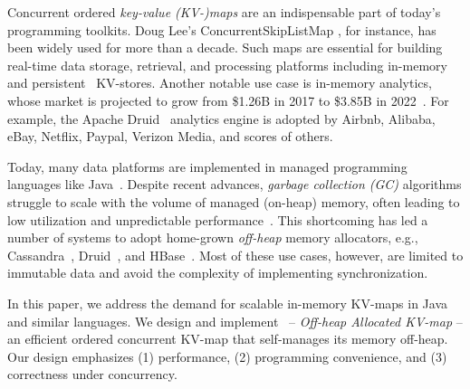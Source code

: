 Concurrent ordered  \emph{key-value (KV-)maps}  are 
an indispensable  part of today's programming toolkits. Doug Lee's ConcurrentSkipListMap \cite{JavaSkipList}, for instance, has been widely used for more than a decade. 
Such maps are essential for building  real-time data storage, retrieval, and processing platforms including 
in-memory~\cite{memcached} and persistent~\cite{Bigtable2008,hbase,Cassandra} KV-stores.
%
Another notable use case is in-memory 
analytics, whose market is projected to grow from \$1.26B in 2017 to \$3.85B in 2022~\cite{analytics-market}. For example, the Apache 
Druid~\cite{Druid} analytics engine is adopted by 
 Airbnb, Alibaba, eBay, Netflix, Paypal,   Verizon Media, and scores of others. 
 
Today, many data platforms are implemented in managed programming languages like 
Java~\cite{Druid,hbase,Cassandra,elasticsearch}.
Despite recent advances, \emph{garbage collection (GC)} algorithms struggle to scale with the volume of 
managed (on-heap) memory, often leading to low utilization and unpredictable performance~\cite{GC}. 
This shortcoming has led a number of systems to adopt  home-grown {\em off-heap\/} memory allocators, e.g., Cassandra~\cite{off-heap-cassandra}, 
Druid~\cite{Druid-off-heap}, and HBase~\cite{HBase-off-heap, accordion, HbaseOffheapWritePath}. Most of these  use cases, however, are limited 
to immutable data and avoid the complexity of implementing  synchronization. 

In this paper, we address the demand for scalable in-memory  KV-maps in Java and similar languages. 
We design and implement \oak\ -- \emph{Off-heap Allocated KV-map} -- an efficient  ordered concurrent KV-map 
that self-manages its memory off-heap.  
Our design emphasizes  (1) performance, (2) programming convenience, and (3) correctness under concurrency. 

